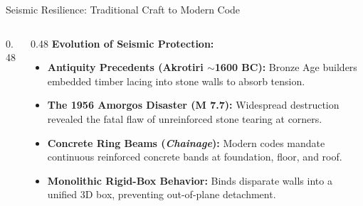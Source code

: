 \begin{frame}[label=seismic]{Seismic Resilience: Traditional Craft to Modern Code}
  \begin{columns}[T, onlytextwidth]
    \begin{column}{0.48\textwidth}
    \end{column}

    \begin{column}{0.48\textwidth}
      \textbf{\color{aegeanblue}Evolution of Seismic Protection:}
      \vspace{0.1em}
      \begin{itemize}
          \setlength{\itemsep}{0.08em}
        \item \textbf{Antiquity Precedents (Akrotiri $\sim$1600 BC):} Bronze Age builders embedded timber lacing into stone walls to absorb tension.
        \item \textbf{The 1956 Amorgos Disaster (M 7.7):} Widespread destruction revealed the fatal flaw of unreinforced stone tearing at corners.
        \item \textbf{Concrete Ring Beams (\textit{Chainage}):} Modern codes mandate continuous reinforced concrete bands at foundation, floor, and roof.
        \item \textbf{Monolithic Rigid-Box Behavior:} Binds disparate walls into a unified 3D box, preventing out-of-plane detachment.
      \end{itemize}
    \end{column}
  \end{columns}
\end{frame}
